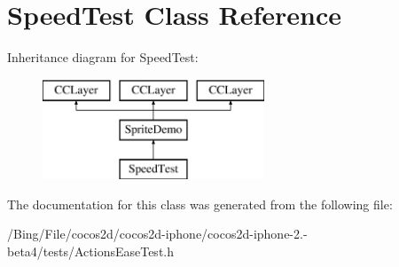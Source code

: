 \hypertarget{interface_speed_test}{\section{Speed\-Test Class Reference}
\label{interface_speed_test}
}
Inheritance diagram for Speed\-Test\-:\begin{figure}[H]
\begin{center}
\leavevmode
\includegraphics[height=3.000000cm]{interface_speed_test}
\end{center}
\end{figure}


The documentation for this class was generated from the following file\-:\begin{DoxyCompactItemize}
\item 
/\-Bing/\-File/cocos2d/cocos2d-\/iphone/cocos2d-\/iphone-\/2.-\/beta4/tests/Actions\-Ease\-Test.\-h\end{DoxyCompactItemize}
